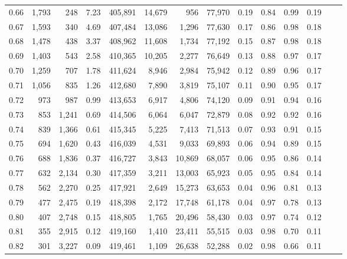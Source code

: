 \begin{tabular}{rrrrrrrrrrrrrr}
0.66 &  1,793 &    248 &     7.23 &  405,891 &   14,679 &     956 &  77,970 &  0.19 &  0.84 &  0.99 &      0.19 \\
0.67 &  1,593 &    340 &     4.69 &  407,484 &   13,086 &   1,296 &  77,630 &  0.17 &  0.86 &  0.98 &      0.18 \\
0.68 &  1,478 &    438 &     3.37 &  408,962 &   11,608 &   1,734 &  77,192 &  0.15 &  0.87 &  0.98 &      0.18 \\
0.69 &  1,403 &    543 &     2.58 &  410,365 &   10,205 &   2,277 &  76,649 &  0.13 &  0.88 &  0.97 &      0.17 \\
0.70 &  1,259 &    707 &     1.78 &  411,624 &    8,946 &   2,984 &  75,942 &  0.12 &  0.89 &  0.96 &      0.17 \\
0.71 &  1,056 &    835 &     1.26 &  412,680 &    7,890 &   3,819 &  75,107 &  0.11 &  0.90 &  0.95 &      0.17 \\
0.72 &    973 &    987 &     0.99 &  413,653 &    6,917 &   4,806 &  74,120 &  0.09 &  0.91 &  0.94 &      0.16 \\
0.73 &    853 &  1,241 &     0.69 &  414,506 &    6,064 &   6,047 &  72,879 &  0.08 &  0.92 &  0.92 &      0.16 \\
0.74 &    839 &  1,366 &     0.61 &  415,345 &    5,225 &   7,413 &  71,513 &  0.07 &  0.93 &  0.91 &      0.15 \\
0.75 &    694 &  1,620 &     0.43 &  416,039 &    4,531 &   9,033 &  69,893 &  0.06 &  0.94 &  0.89 &      0.15 \\
0.76 &    688 &  1,836 &     0.37 &  416,727 &    3,843 &  10,869 &  68,057 &  0.06 &  0.95 &  0.86 &      0.14 \\
0.77 &    632 &  2,134 &     0.30 &  417,359 &    3,211 &  13,003 &  65,923 &  0.05 &  0.95 &  0.84 &      0.14 \\
0.78 &    562 &  2,270 &     0.25 &  417,921 &    2,649 &  15,273 &  63,653 &  0.04 &  0.96 &  0.81 &      0.13 \\
0.79 &    477 &  2,475 &     0.19 &  418,398 &    2,172 &  17,748 &  61,178 &  0.04 &  0.97 &  0.78 &      0.13 \\
0.80 &    407 &  2,748 &     0.15 &  418,805 &    1,765 &  20,496 &  58,430 &  0.03 &  0.97 &  0.74 &      0.12 \\
0.81 &    355 &  2,915 &     0.12 &  419,160 &    1,410 &  23,411 &  55,515 &  0.03 &  0.98 &  0.70 &      0.11 \\
0.82 &    301 &  3,227 &     0.09 &  419,461 &    1,109 &  26,638 &  52,288 &  0.02 &  0.98 &  0.66 &      0.11 \\

\end{tabular}
